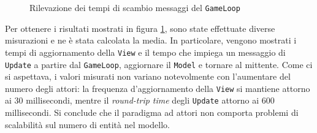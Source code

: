 \begin{figure}[H]
    \centering
    \caption{Rilevazione dei tempi di scambio messaggi del \texttt{GameLoop}
    \label{fig:performance-evaluation}}
\end{figure}

Per ottenere i risultati mostrati in figura \ref{fig:performance-evaluation}, sono state effettuate diverse misurazioni
e ne è stata calcolata la media. In particolare, vengono mostrati i tempi di aggiornamento della \texttt{View} e il
tempo che impiega un messaggio di \texttt{Update} a partire dal \texttt{GameLoop}, aggiornare il \texttt{Model} e
tornare al mittente. Come ci si aspettava, i valori misurati non variano notevolmente con l'aumentare del numero degli
attori: la frequenza d'aggiornamento della \texttt{View} si mantiene attorno ai 30 millisecondi, mentre il
\textit{round-trip time} degli \texttt{Update} attorno ai 600 millisecondi. Si conclude che il paradigma ad attori
non comporta problemi di scalabilità sul numero di entità nel modello.
